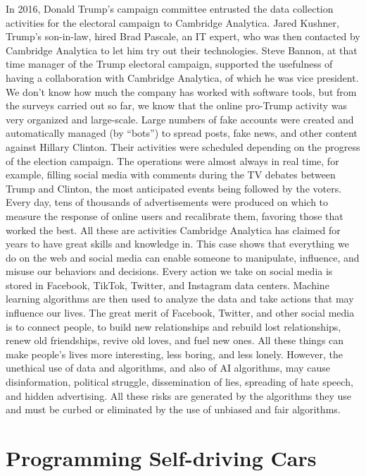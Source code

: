 In 2016, Donald Trump's campaign committee entrusted the data collection activities for the electoral campaign to Cambridge Analytica. Jared Kushner, Trump's son-in-law, hired Brad Pascale, an IT expert, who was then contacted by Cambridge Analytica to let him try out their technologies. Steve Bannon, at that time manager of the Trump electoral campaign, supported the usefulness of \hbox{having} a collaboration with Cambridge Analytica, of which he was vice president. We don't know how much the company has worked with software tools, but from the surveys carried out so far, we know that the online pro-Trump activity was very organized and large-scale. Large numbers of fake accounts were created and automatically managed (by ``bots'') to spread posts, fake news, and other content against Hillary Clinton. Their activities were scheduled depending on the progress of the election campaign. The operations were almost always in real time, for example, filling social media with comments during the TV debates between Trump and Clinton, the most anticipated events being followed by the voters. Every day, tens of thousands of advertisements were produced on which to measure the response of online users and recalibrate them, favoring those that worked the best. All these are activities Cambridge Analytica has claimed for years to have great skills and knowledge in. This case shows that everything we do on the web and social media can enable someone to manipulate, influence, and misuse our behaviors and decisions. Every action we take on social media is stored in Facebook, TikTok, Twitter, and Instagram data centers. Machine learning algorithms are then used to analyze the data and take actions that may influence our lives. The great merit of Facebook, Twitter, and other social media is to connect people, to build new relationships and rebuild lost relationships, renew old friendships, revive old loves, and fuel new ones. All these things can make people's lives more interesting, less boring, and less lonely. However, the unethical use of data and algorithms, and also of AI algorithms, may cause disinformation, political struggle, dissemination of lies, spreading of hate speech, and hidden advertising. All these risks are generated by the algorithms they use and must be curbed or eliminated by the use of unbiased and fair algorithms.

\section{\label{sec:5.4}Programming Self-driving Cars}

